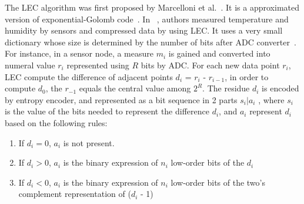 The LEC algorithm was first proposed by Marcelloni et
al.~\cite{marcelloni2008simple}. It is a approximated version of
exponential-Golomb code~\cite{teuhola1978compression}. In
~\cite{marcelloni2008simple}, authors measured temperature and humidity by
sensors and compressed data by using LEC. It uses a very small dictionary whose
size is determined by the number of bits after ADC 
converter~\cite{marcelloni2008simple,marcelloni2009efficient}.  For instance, in
a sensor node, a measure $m_i$ is gained and converted into numeral value $r_i$
represented using $R$ bits by ADC. For each new data point $r_i$, LEC compute the
difference of adjacent points $d_i$ = $r_i$ - $r_{i-1}$, in order to compute
$d_0$, the $r_{-1}$ equals the central value among $2^R$. The residue $d_i$
is encoded by entropy encoder, and represented as a bit sequence in 2 parts $s_i |
a_i$ , where $s_i$ is the value of the bits needed to represent the difference
$d_i$, and $a_i$ represent $d_i$ based on the following rules:
\begin{enumerate}
    \item If $d_i = 0$, $a_i$ is not present.    
    \item If $d_i > 0$, $a_i$ is the binary expression of $n_i$ low-order bits
    of the $d_i$
    \item If $d_i < 0$, $a_i$ is the binary expression of $n_i$ low-order bits
    of the two's complement representation of ($d_i$ - 1)
\end{enumerate}

